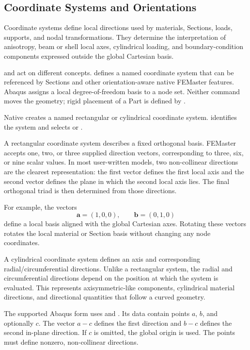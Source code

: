 \subsection{Coordinate Systems and Orientations}
\label{sec:coordinates}

Coordinate systems define local directions used by materials, Sections, loads, supports, and nodal transformations. They determine the interpretation of anisotropy, beam or shell local axes, cylindrical loading, and boundary-condition components expressed outside the global Cartesian basis.

 and  act on different concepts.  defines a named coordinate system that can be referenced by Sections and other orientation-aware native FEMaster features. Abaqus  assigns a local degree-of-freedom basis to a node set. Neither command moves the geometry; rigid placement of a Part is defined by .


Native  creates a named rectangular or cylindrical coordinate system.  identifies the system and  selects  or .

A rectangular coordinate system describes a fixed orthogonal basis. FEMaster accepts one, two, or three supplied direction vectors, corresponding to three, six, or nine scalar values. In most user-written models, two non-collinear directions are the clearest representation: the first vector defines the first local axis and the second vector defines the plane in which the second local axis lies. The final orthogonal triad is then determined from those directions.

For example, the vectors
\[
\boldsymbol a=(1,0,0),\qquad \boldsymbol b=(0,1,0)
\]
define a local basis aligned with the global Cartesian axes. Rotating these vectors rotates the local material or Section basis without changing any node coordinates.

A cylindrical coordinate system defines an axis and corresponding radial/circumferential directions. Unlike a rectangular system, the radial and circumferential directions depend on the position at which the system is evaluated. This represents axisymmetric-like components, cylindrical material directions, and directional quantities that follow a curved geometry.

The supported Abaqus  form uses  and . Its data contain points \(a\), \(b\), and optionally \(c\). The vector \(a-c\) defines the first direction and \(b-c\) defines the second in-plane direction. If \(c\) is omitted, the global origin is used. The points must define nonzero, non-collinear directions.


